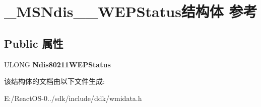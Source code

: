 \hypertarget{struct___m_s_ndis__80211___w_e_p_status}{}\section{\+\_\+\+M\+S\+Ndis\+\_\+\_\+\+W\+E\+P\+Status结构体 参考}
\label{struct___m_s_ndis__80211___w_e_p_status}
\subsection*{Public 属性}
\begin{DoxyCompactItemize}
\item 
\mbox{\label{struct___m_s_ndis__80211___w_e_p_status_a7db73d17ccb626d9f5718b32e738c997}} 
U\+L\+O\+NG {\bfseries Ndis80211\+W\+E\+P\+Status}
\end{DoxyCompactItemize}


该结构体的文档由以下文件生成\+:\begin{DoxyCompactItemize}
\item 
E\+:/\+React\+O\+S-\/0../sdk/include/ddk/wmidata.\+h\end{DoxyCompactItemize}
